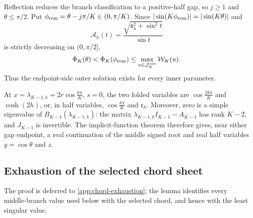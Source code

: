 \documentclass[10pt,twoside]{siamart1116}
\numberwithin{equation}{section}
\begin{document}
Reflection reduces the branch classification to a positive-half gap, so
\(j\geq1\)
and \(\theta\leq\pi/2\).  Put
\(\phi_{\rm rem}=\theta-j\pi/K\in(0,\pi/K)\).  Since
\(|\sin(K\phi_{\rm rem})|=|\sin(K\theta)|\) and
\[
 \mathcal A_h(t)=
 \frac{\sqrt{\mathfrak s_h^2+\sin^2t}}{\sin t}
\]
is strictly decreasing on \((0,\pi/2]\),
\begin{equation}\label{eq:outer-level-dominates}
 \Phi_K(\theta)<\Phi_K(\phi_{\rm rem})
 \leq\max_{u\in\mathcal J_K^{\rm out}}\mathcal W_K(u).
\end{equation}
Thus the endpoint-side outer solution exists for every inner parameter.

At \(x=\lambda_{K-1,k}=2r\cos\frac{k\pi}{K}\), \(s=0\), the two
folded variables are \(\cos\frac{2k\pi}{K}\) and
\(\cosh(2h)\), or, in half variables, \(\cos\frac{k\pi}{K}\) and
\(\mathfrak c_h\).  Moreover, zero is a simple eigenvalue of
\(B_{K-1}(\lambda_{K-1,k})\): the matrix
\(\lambda_{K-1,k}I_{K-1}-A_{K-1}\) has rank \(K-2\), and \(J_{K-1}\) is
invertible.  The implicit-function theorem therefore gives, near either
gap endpoint, a real continuation of the middle signed root and real
half variables \(y=\cos\theta\) and \(z\).

\subsection{Exhaustion of the selected chord sheet}
\label{subsec:chord-exhaustion}


The proof is deferred to \cref{app:chord-exhaustion}; the lemma identifies
every middle-branch value used below with the selected chord, and hence with
the least singular value.
\end{document}
